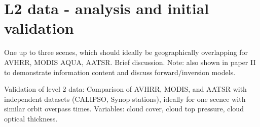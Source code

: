 \section{L2 data - analysis and initial validation}\label{L2_data}

One up to three scenes, which should ideally be geographically overlapping for AVHRR, MODIS AQUA, AATSR. Brief discussion. Note: also shown in paper II to demonstrate information content and discuss forward/inversion models.

Validation of level 2 data:
Comparison of AVHRR, MODIS, and AATSR with independent datasets (CALIPSO, Synop stations), ideally for one scence with similar orbit overpass times.
Variables: cloud cover, cloud top pressure, cloud optical thickness.
